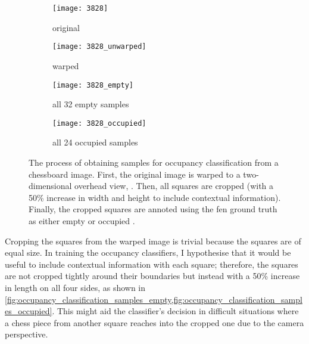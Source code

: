 \documentclass[../report.tex]{subfiles}
\begin{document}
\begin{figure}
    \centering
    \begin{subfigure}[b]{0.47\textwidth}
        \centering
        \texttt{[image: 3828]}
        \caption{original}
        \label{fig:occupancy_classification_samples_original}
    \end{subfigure}
    \hfill
    \begin{subfigure}[b]{0.47\textwidth}
        \centering
        \texttt{[image: 3828\_unwarped]}
        \caption{warped}
        \label{fig:occupancy_classification_samples_warped}
    \end{subfigure}
    
    \bigskip
    \begin{subfigure}[b]{0.47\textwidth}
        \centering
        \texttt{[image: 3828\_empty]}
        \caption{all 32 empty samples}
        \label{fig:occupancy_classification_samples_empty}
    \end{subfigure}
    \hfill
    \begin{subfigure}[b]{0.47\textwidth}
        \centering
        \texttt{[image: 3828\_occupied]}
        \caption{all 24 occupied samples}
        \label{fig:occupancy_classification_samples_occupied}
    \end{subfigure}
    \caption[The process of obtaining samples for occupancy classification from a chessboard image.]{The process of obtaining samples for occupancy classification from a chessboard image. First, the original image  is warped to a two-dimensional overhead view, . Then, all squares are cropped (with a 50\% increase in width and height to include contextual information). Finally, the cropped squares are annoted using the \gls{fen} ground truth as either empty  or occupied .}
    \label{fig:occupancy_classification_samples}
\end{figure}

Cropping the squares from the warped image is trivial because the squares are of equal size.
In training the occupancy classifiers, I hypothesise that it would be useful to include contextual information with each square; therefore, the squares are not cropped tightly around their boundaries but instead with a 50\% increase in length on all four sides, as shown in \cref{fig:occupancy_classification_samples_empty,fig:occupancy_classification_samples_occupied}.
This might aid the classifier's decision in difficult situations where a chess piece from another square reaches into the cropped one due to the camera perspective.
\end{document}
